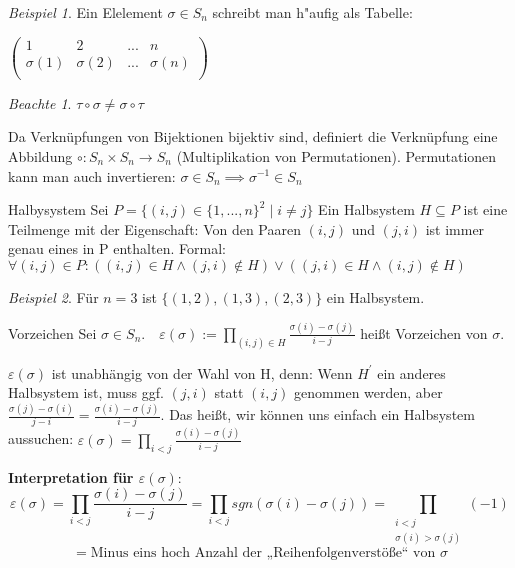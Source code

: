 \documentclass[11pt]{article}
\theoremstyle{remark}
\newtheorem{exa}{Beispiel}[section]
\newtheorem*{notte}{Beachte}
\theoremstyle{definition}
\theoremstyle{remark}
\begin{document}
\begin{exa}
  Ein Elelement \(\sigma \in S_n\) schreibt man h"aufig als Tabelle:
  
  \(\left(\begin{array}{cccc}
  	1 & 2 & ... & n\\
  	\sigma(1) & \sigma(2) & ... & \sigma(n)\\
  \end{array}\right)\)
\end{exa}

\begin{notte}
  $\tau\circ\sigma \not= \sigma\circ\tau$
\end{notte}

Da Verknüpfungen von Bijektionen bijektiv sind, definiert die Verknüpfung eine Abbildung \(\circ: S_n \times S_n \to S_n \) (Multiplikation von Permutationen). Permutationen kann man auch invertieren: \(\sigma \in S_n \implies \sigma^{-1} \in S_n \)

\begin{definition}{Halbysystem}{}
  Sei \(P=\{(i,j) \in \{1,...,n\}^2\mid i\neq j \} \) Ein Halbsystem \(H \subseteq P \) ist eine Teilmenge mit der Eigenschaft: Von den Paaren \((i,j) \) und \((j,i) \) ist immer genau eines in P enthalten. Formal:
  \(\forall (i,j) \in P: ((i,j) \in H \land (j,i) \notin H) \lor ((j,i) \in H \land (i,j) \notin H )\)
\end{definition}

\begin{exa}
  Für \(n=3 \) ist \(\{(1,2), (1,3), (2,3)\} \) ein Halbsystem.
\end{exa}

\begin{definition}{Vorzeichen}{}
  Sei \(\sigma \in S_n. \quad \varepsilon(\sigma):= \prod\limits_{(i,j)\in H} \frac{\sigma(i)-\sigma(j)}{i-j} \) heißt Vorzeichen von \(\sigma \).
\end{definition}

\(\varepsilon(\sigma) \) ist unabhängig von der Wahl von H, denn: Wenn \(H^\prime \) ein anderes Halbsystem ist, muss ggf. \((j,i) \) statt \((i,j) \) genommen werden, aber \(\frac{\sigma(j)-\sigma(i)}{j-i} = \frac{\sigma(i)-\sigma(j)}{i-j} \).
Das heißt, wir können uns einfach ein Halbsystem aussuchen:
\(\varepsilon(\sigma) = \prod\limits_{i<j}\frac{\sigma(i)-\sigma(j)}{i-j} \)

\textbf{Interpretation für \(\varepsilon(\sigma) \)}:
\[\varepsilon(\sigma) = \prod\limits_{i<j}\frac{\sigma(i)-\sigma(j)}{i-j} = \prod_{i<j} sgn(\sigma(i)-\sigma(j)) = \prod_{\substack{i<j\\ \sigma(i)>\sigma(j)}} (-1)\]\[ = \text{Minus eins hoch Anzahl der „Reihenfolgenverstöße“ von }\sigma\]
\end{document}

